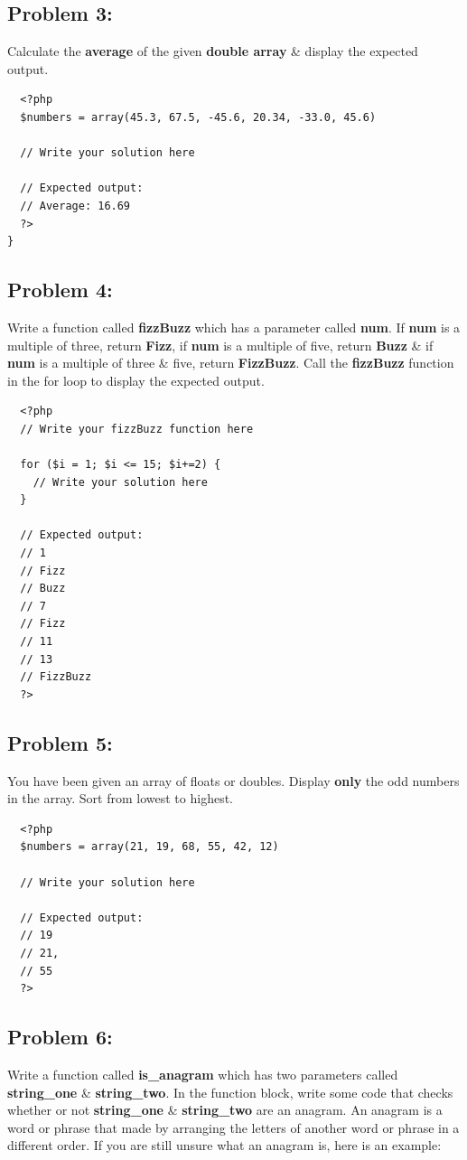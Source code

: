 \documentclass{article}
\begin{document}
\subsection*{Problem 3:} 
Calculate the \textbf{average} of the given \textbf{double array} \& display the expected output.

\begin{verbatim}
  <?php
  $numbers = array(45.3, 67.5, -45.6, 20.34, -33.0, 45.6)

  // Write your solution here

  // Expected output:
  // Average: 16.69 
  ?>
}
\end{verbatim}

\subsection*{Problem 4:}
Write a function called \textbf{fizzBuzz} which has a parameter called \textbf{num}. If \textbf{num} is a multiple of three, return \textbf{Fizz}, if \textbf{num} is a multiple of five, return \textbf{Buzz} \& if \textbf{num} is a multiple of three \& five, return \textbf{FizzBuzz}. Call the \textbf{fizzBuzz} function in the for loop to display the expected output.

\begin{verbatim}
  <?php
  // Write your fizzBuzz function here
  
  for ($i = 1; $i <= 15; $i+=2) {
    // Write your solution here
  }

  // Expected output:
  // 1
  // Fizz
  // Buzz
  // 7
  // Fizz
  // 11
  // 13
  // FizzBuzz
  ?>
\end{verbatim}

\subsection*{Problem 5:}
You have been given an array of floats or doubles. Display \textbf{only} the odd numbers in the array. Sort from lowest to highest.

\begin{verbatim}
  <?php  
  $numbers = array(21, 19, 68, 55, 42, 12) 
  
  // Write your solution here

  // Expected output:
  // 19
  // 21,
  // 55
  ?>
\end{verbatim}

\subsection*{Problem 6:}
Write a function called \textbf{is\_anagram} which has two parameters called \textbf{string\_one} \& \textbf{string\_two}. In the function block, write some code that checks whether or not \textbf{string\_one} \& \textbf{string\_two} are an anagram. An anagram is a word or phrase that made by arranging the letters of another word or phrase in a different order. If you are still unsure what an anagram is, here is an example:
\end{document}
